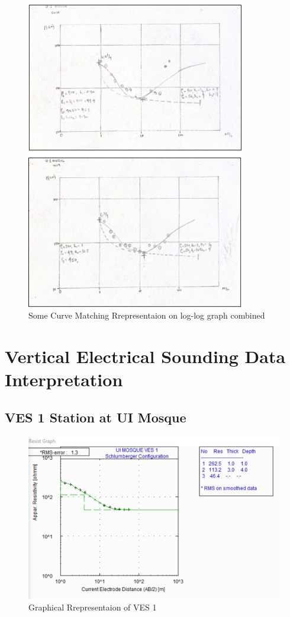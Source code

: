 \documentclass[12pt,a4paper]{report}
\begin{document}
\begin{figure}[H]
    \centering
    \includegraphics[width=0.85\textwidth]{Picture1.png}
    \caption{Some Curve Matching Rrepresentaion on log-log graph combined}
    \label{fig:Curve MAtching}
\end{figure}

\section{Vertical Electrical Sounding Data Interpretation}

\subsection{VES 1 Station at UI Mosque}

\begin{figure}[H]
    \centering
    \includegraphics[width=1.0\textwidth]{ui_ves1.png}
    \caption{Graphical Rrepresentaion of VES 1}
    \label{fig:VES_1_Curve}
\end{figure}
\end{document}
